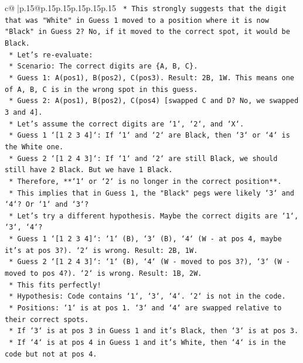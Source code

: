 \documentclass{article}
\begin{document}
{\begin{supertabular}{c@{$\;$}|p{.15\linewidth}@{}p{.15\linewidth}p{.15\linewidth}p{.15\linewidth}p{.15\linewidth}p{.15\linewidth}}
{{{\texttt{    *   This strongly suggests that the digit that was "White" in Guess 1 moved to a position where it is now "Black" in Guess 2? No, if it moved to the correct spot, it would be Black.} \\
\texttt{    *   Let's re{-}evaluate:} \\
\texttt{        *   Scenario: The correct digits are \{A, B, C\}.} \\
\texttt{        *   Guess 1: A(pos1), B(pos2), C(pos3). Result: 2B, 1W. This means one of A, B, C is in the wrong spot in this guess.} \\
\texttt{        *   Guess 2: A(pos1), B(pos2), C(pos4) {[}swapped C and D? No, we swapped 3 and 4{]}.} \\
\texttt{        *   Let's assume the correct digits are `1`, `2`, and `X`.} \\
\texttt{        *   Guess 1 `{[}1 2 3 4{]}`: If `1` and `2` are Black, then `3` or `4` is the White one.} \\
\texttt{        *   Guess 2 `{[}1 2 4 3{]}`: If `1` and `2` are still Black, we should still have 2 Black. But we have 1 Black.} \\
\texttt{        *   Therefore, **`1` or `2` is no longer in the correct position**.} \\
\texttt{        *   This implies that in Guess 1, the "Black" pegs were likely `3` and `4`? Or `1` and `3`?} \\
\texttt{        *   Let's try a different hypothesis. Maybe the correct digits are `1`, `3`, `4`?} \\
\texttt{            *   Guess 1 `{[}1 2 3 4{]}`: `1` (B), `3` (B), `4` (W {-} at pos 4, maybe it's at pos 3?). `2` is wrong. Result: 2B, 1W.} \\
\texttt{            *   Guess 2 `{[}1 2 4 3{]}`: `1` (B), `4` (W {-} moved to pos 3?), `3` (W {-} moved to pos 4?). `2` is wrong. Result: 1B, 2W.} \\
\texttt{            *   This fits perfectly!} \\
\texttt{            *   Hypothesis: Code contains `1`, `3`, `4`. `2` is not in the code.} \\
\texttt{            *   Positions: `1` is at pos 1. `3` and `4` are swapped relative to their correct spots.} \\
\texttt{            *   If `3` is at pos 3 in Guess 1 and it's Black, then `3` is at pos 3.} \\
\texttt{            *   If `4` is at pos 4 in Guess 1 and it's White, then `4` is in the code but not at pos 4.} \\
}}}
\end{supertabular}}
\end{document}
